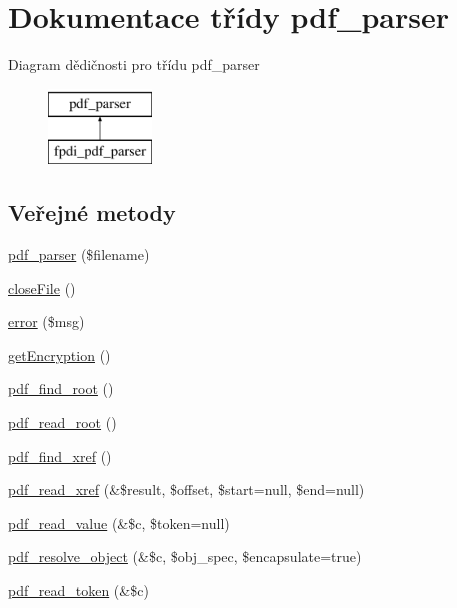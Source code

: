 \hypertarget{classpdf__parser}{\section{Dokumentace třídy pdf\-\_\-parser}
\label{classpdf__parser}
}
Diagram dědičnosti pro třídu pdf\-\_\-parser\begin{figure}[H]
\begin{center}
\leavevmode
\includegraphics[height=2.000000cm]{classpdf__parser}
\end{center}
\end{figure}
\subsection*{Veřejné metody}
\begin{DoxyCompactItemize}
\item 
\hyperlink{classpdf__parser_a74fd454ee64e0f41ee56dc58e73232cf}{pdf\-\_\-parser} (\$filename)
\item 
\hyperlink{classpdf__parser_afe0987ccabd61827f57a410ebb261e0c}{close\-File} ()
\item 
\hyperlink{classpdf__parser_a13021b68f6fc88fea1af03853eb80c4c}{error} (\$msg)
\item 
\hyperlink{classpdf__parser_a7d8708c0d4a88ee03e3bbd2fb0d77527}{get\-Encryption} ()
\item 
\hyperlink{classpdf__parser_a7fda6bf08150ce77b966567c4f34ad6c}{pdf\-\_\-find\-\_\-root} ()
\item 
\hyperlink{classpdf__parser_ab9a412b4b73487ee6777921365675552}{pdf\-\_\-read\-\_\-root} ()
\item 
\hyperlink{classpdf__parser_a91175d0a4309e83393ef9c8ad7fcf4db}{pdf\-\_\-find\-\_\-xref} ()
\item 
\hyperlink{classpdf__parser_a14a16067f93e11997d707b431d4abf52}{pdf\-\_\-read\-\_\-xref} (\&\$result, \$offset, \$start=null, \$end=null)
\item 
\hyperlink{classpdf__parser_a5239f58da56320d9958215ac0c6ebe7f}{pdf\-\_\-read\-\_\-value} (\&\$c, \$token=null)
\item 
\hyperlink{classpdf__parser_a90f2d44c253fdde584e23679ceb1f538}{pdf\-\_\-resolve\-\_\-object} (\&\$c, \$obj\-\_\-spec, \$encapsulate=true)
\item 
\hyperlink{classpdf__parser_a14878a92d114fe2d266af4958fbec792}{pdf\-\_\-read\-\_\-token} (\&\$c)
\end{DoxyCompactItemize}
